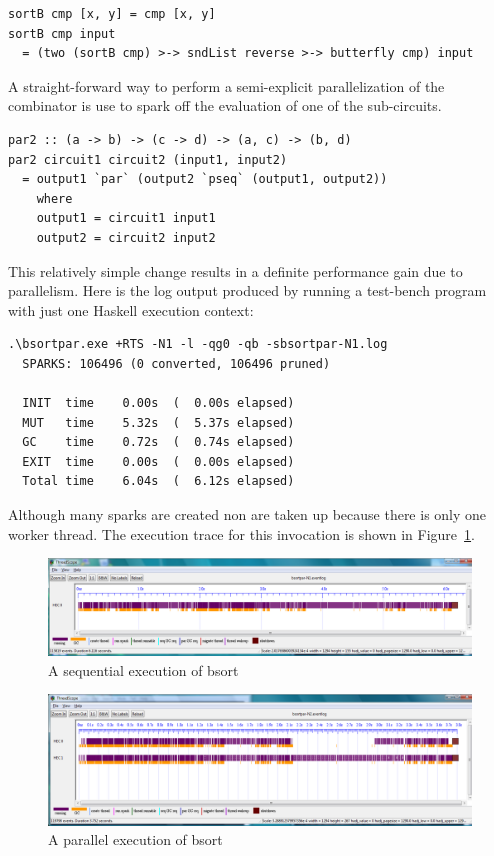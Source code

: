 \begin{lstlisting}
sortB cmp [x, y] = cmp [x, y]
sortB cmp input
  = (two (sortB cmp) >-> sndList reverse >-> butterfly cmp) input
\end{lstlisting}


A straight-forward way to perform a semi-explicit parallelization of the  combinator is use  to spark off the evaluation of one of the sub-circuits.

\begin{lstlisting}
par2 :: (a -> b) -> (c -> d) -> (a, c) -> (b, d)
par2 circuit1 circuit2 (input1, input2)
  = output1 `par` (output2 `pseq` (output1, output2))
    where
    output1 = circuit1 input1
    output2 = circuit2 input2
\end{lstlisting}

This relatively simple change results in a definite performance gain due to parallelism. Here is the log output produced by running a test-bench program with just one Haskell execution context:

\begin{verbatim}
.\bsortpar.exe +RTS -N1 -l -qg0 -qb -sbsortpar-N1.log
  SPARKS: 106496 (0 converted, 106496 pruned)

  INIT  time    0.00s  (  0.00s elapsed)
  MUT   time    5.32s  (  5.37s elapsed)
  GC    time    0.72s  (  0.74s elapsed)
  EXIT  time    0.00s  (  0.00s elapsed)
  Total time    6.04s  (  6.12s elapsed)
\end{verbatim}

Although many sparks are created non are taken up because there is only one worker thread. The execution trace for this invocation is shown in Figure~\ref{f:bsortpar-n1}.

\begin{figure}
\begin{center}
\includegraphics[width=17cm]{bsortpar-n1.png}
\end{center}
\caption{A sequential execution of bsort}
\label{f:bsortpar-n1}
\end{figure}

\begin{figure}
\begin{center}
\includegraphics[width=17cm]{bsortpar-n2.png}
\end{center}
\caption{A parallel execution of bsort}
\label{f:bsortpar-n2}
\end{figure}

